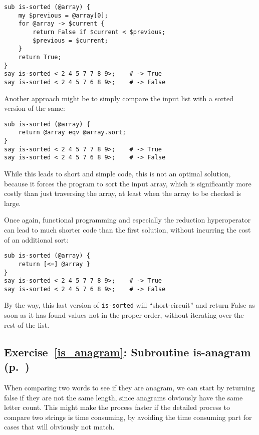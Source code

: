 \begin{verbatim}
sub is-sorted (@array) {
    my $previous = @array[0];
    for @array -> $current {
        return False if $current < $previous;
        $previous = $current;
    }
    return True;
}
say is-sorted < 2 4 5 7 7 8 9>;    # -> True
say is-sorted < 2 4 5 7 6 8 9>;    # -> False
\end{verbatim}

Another approach might be to simply compare the input 
list with a sorted version of the same:

\begin{verbatim}
sub is-sorted (@array) {
    return @array eqv @array.sort;
}
say is-sorted < 2 4 5 7 7 8 9>;    # -> True
say is-sorted < 2 4 5 7 6 8 9>;    # -> False
\end{verbatim}

While this leads to short and simple code, this is not 
an optimal solution, because it forces the program to 
sort the input array, which is significantly more costly 
than just traversing the array, at least when the array 
to be checked is large.

Once again, functional programming and especially the 
reduction hyperoperator can lead to much shorter code 
than the first solution, without incurring the cost 
of an additional sort:

\begin{verbatim}
sub is-sorted (@array) {
    return [<=] @array }
}
say is-sorted < 2 4 5 7 7 8 9>;    # -> True
say is-sorted < 2 4 5 7 6 8 9>;    # -> False
\end{verbatim}

By the way, this last version of {\tt is-sorted} will 
``short-circuit'' and return False as soon as it has 
found values not in the proper order, without iterating 
over the rest of the list.

\subsection{Exercise~\ref{is_anagram}: Subroutine is-anagram (p.~\pageref{is_anagram})}
\label{sol_is_anagram}

When comparing two words to see if they are anagram, we 
can start by returning false if they are not the same 
length, since anagrams obviously have the same letter 
count. This might make the process faster if the detailed 
process to compare two strings is time consuming, by 
avoiding the time consuming part for cases that will 
obviously not match.


